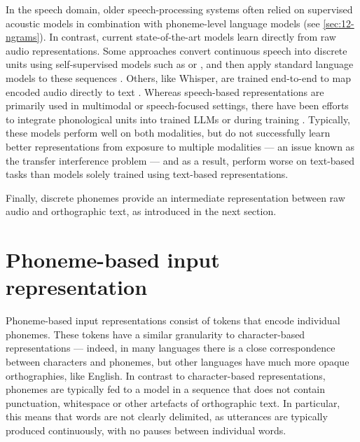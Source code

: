 In the speech domain, older speech-processing systems often relied on supervised acoustic models in combination with phoneme-level language models (see \cref{sec:12-ngrams}). In contrast, current state-of-the-art models learn directly from raw audio representations. Some approaches convert continuous speech into discrete units using self-supervised models such as  \citep{baevski2020wav2vec} or  \citep{hsu-2021-hubert}, and then apply standard language models to these sequences \citep{lakhotia2021generative}. Others, like Whisper, are trained end-to-end to map encoded audio directly to text \citep{radford2023robust}. Whereas speech-based representations are primarily used in multimodal or speech-focused settings, there have been efforts to integrate phonological units into trained LLMs \citep{nguyen-etal-2025-spirit} or during training \citep{bapna2021slam}. Typically, these models perform well on both modalities, but do not successfully learn better representations from exposure to multiple modalities --- an issue known as the transfer interference problem \citep{arivazhagan2019massively} --- and as a result, perform worse on text-based tasks than models solely trained using text-based representations. 

Finally, discrete phonemes provide an intermediate representation between raw audio and orthographic text, as introduced in the next section. %


\section{Phoneme-based input representation}\label{sec:12-phonemic}

Phoneme-based input representations consist of tokens that encode individual phonemes. These tokens have a similar granularity to character-based representations --- indeed, in many languages there is a close correspondence between characters and phonemes, but other languages have much more opaque orthographies, like English. In contrast to character-based representations, phonemes are typically fed to a model in a sequence that does not contain punctuation, whitespace or other artefacts of orthographic text. In particular, this means that words are not clearly delimited, as utterances are typically produced continuously, with no pauses between individual words.

